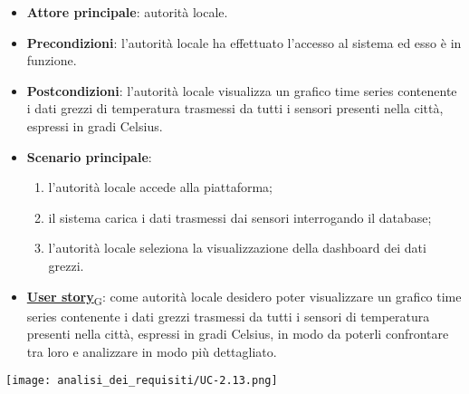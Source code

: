 \begin{itemize}
	\item \textbf{Attore principale}: autorità locale.
	\item \textbf{Precondizioni}: l'autorità locale ha effettuato l'accesso al sistema ed esso è in funzione.
	\item \textbf{Postcondizioni}: l'autorità locale visualizza un grafico time series contenente i dati grezzi di temperatura trasmessi da tutti i sensori
	      presenti nella città, espressi in gradi Celsius.
	\item \textbf{Scenario principale}:
	      \begin{enumerate}
		      \item l'autorità locale accede alla piattaforma;
		      \item il sistema carica i dati trasmessi dai sensori interrogando il database;
		      \item l'autorità locale seleziona la visualizzazione della dashboard dei dati grezzi.
	      \end{enumerate}
	\item \href{https://7last.github.io/docs/pb/documentazione-interna/glossario\#user-story}{\textbf{User story}\textsubscript{G}}:
	      come autorità locale desidero poter visualizzare un grafico time series contenente i dati grezzi trasmessi da tutti i sensori
	      di temperatura presenti nella città, espressi in gradi Celsius, in modo da poterli confrontare tra loro e analizzare in modo più dettagliato.
\end{itemize}
\begin{center}
	\texttt{[image: analisi\_dei\_requisiti/UC-2.13.png]}
\end{center}


